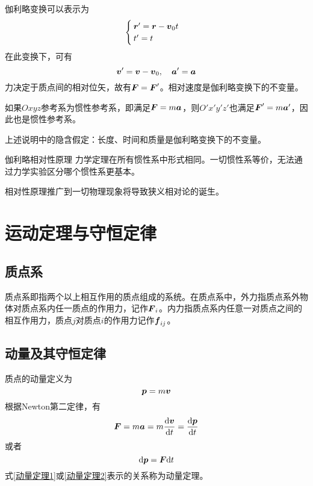 伽利略变换可以表示为
\begin{equation}
	\begin{cases}
		\boldsymbol{r}' = \boldsymbol{r} - \boldsymbol{v}_0t \\
		t' = t
	\end{cases}
\end{equation}
在此变换下，可有
\begin{equation}
	\boldsymbol{v}' = \boldsymbol{v} - \boldsymbol{v}_0,\quad \boldsymbol{a}' = \boldsymbol{a}
\end{equation}
力决定于质点间的相对位矢，故有$\boldsymbol{F} = \boldsymbol{F}'$。相对速度是伽利略变换下的不变量。

如果$Oxyz$参考系为惯性参考系，即满足$\boldsymbol{F} = m\boldsymbol{a}$，则$O'x'y'z'$也满足$\boldsymbol{F}' = m\boldsymbol{a}'$，因此也是惯性参考系。

上述说明中的隐含假定：长度、时间和质量是伽利略变换下的不变量。

{\heiti 伽利略相对性原理} \quad 力学定理在所有惯性系中形式相同。一切惯性系等价，无法通过力学实验区分哪个惯性系更基本。

相对性原理推广到一切物理现象将导致狭义相对论的诞生。

\section{运动定理与守恒定律}

\subsection{质点系}

质点系即指两个以上相互作用的质点组成的系统。在质点系中，{\heiti 外力}指质点系外物体对质点系内任一质点的作用力，记作$\boldsymbol{F}_i$。{\heiti 内力}指质点系内任意一对质点之间的相互作用力，质点$j$对质点$i$的作用力记作$\boldsymbol{f}_{ij}$。

\subsection{动量及其守恒定律}

质点的{\heiti 动量}定义为
\begin{equation}
	\boldsymbol{p} = m\boldsymbol{v}
\end{equation}
根据Newton第二定律，有
\begin{equation}
	\boldsymbol{F} = m\boldsymbol{a} = m\frac{\mathrm{d} \boldsymbol{v}}{\mathrm{d} t} = \frac{\mathrm{d} \boldsymbol{p}}{\mathrm{d} t}
	\label{动量定理1}
\end{equation}
或者
\begin{equation}
	\mathrm{d} \boldsymbol{p} = \boldsymbol{F} \mathrm{d} t
	\label{动量定理2}
\end{equation}
式\eqref{动量定理1}或\eqref{动量定理2}表示的关系称为{\heiti 动量定理}。

